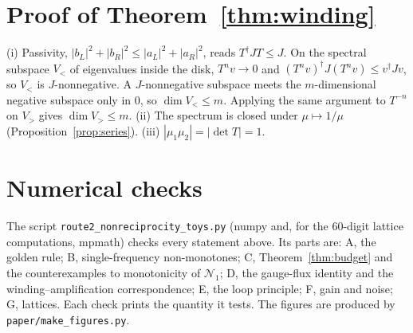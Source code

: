 \documentclass[aps,pra,twocolumn,superscriptaddress,floatfix,nofootinbib]{revtex4-2}
\theoremstyle{definition}
\newcommand{\NN}{\mathcal N_1}
\begin{document}
\section{Proof of Theorem~\ref{thm:winding}}\label{app:winding}

(i) Passivity, $|b_L|^2+|b_R|^2\le|a_L|^2+|a_R|^2$, reads $T^\dagger JT\le J$. On the spectral subspace $V_<$ of eigenvalues inside the disk, $T^nv\to0$ and $(T^nv)^\dagger J(T^nv)\le v^\dagger Jv$, so $V_<$ is $J$-nonnegative. A $J$-nonnegative subspace meets the $m$-dimensional negative subspace only in $0$, so $\dim V_<\le m$. Applying the same argument to $T^{-n}$ on $V_>$ gives $\dim V_>\le m$. (ii) The spectrum is closed under $\mu\mapsto1/\mu$ (Proposition~\ref{prop:series}). (iii) $|\mu_1\mu_2|=|\det T|=1$.

\section{Numerical checks}\label{app:num}

The script \texttt{route2\_nonreciprocity\_toys.py} (numpy and, for the 60-digit lattice computations, mpmath) checks every statement above. Its parts are: A, the golden rule; B, single-frequency non-monotones; C, Theorem~\ref{thm:budget} and the counterexamples to monotonicity of $\NN$; D, the gauge-flux identity and the winding--amplification correspondence; E, the loop principle; F, gain and noise; G, lattices. Each check prints the quantity it tests. The figures are produced by \texttt{paper/make\_figures.py}.
\end{document}
